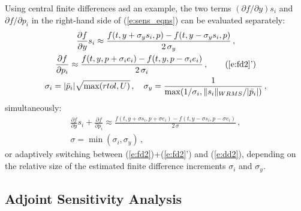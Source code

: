 Using central finite differences asd an example, the two terms 
$({\partial f}/{\partial y}) s_i$ 
and ${\partial f}/{\partial p_i}$ in the right-hand side of (\ref{e:sens_eqns}) 
can be evaluated separately:
\begin{gather}
  \frac{\partial f}{\partial y} s_i \approx \frac{f(t, y+\sigma_y s_i, p)-
    f(t, y-\sigma_y s_i, p)}{2\,\sigma_y} \, , \label{e:fd2} \\
  \frac{\partial f}{\partial p_i} \approx \frac{f(t,y,p + \sigma_i e_i)-
    f(t,y,p - \sigma_i e_i)}{2\,\sigma_i} \, , \tag{\ref{e:fd2}'} \\
  \sigma_i = |{\bar p}_i| \sqrt{\max(rtol, U)} \, , \quad
  \sigma_y = \frac{1}{\max(1/\sigma_i, \|s_i\|_{WRMS}/|{\bar p}_i|)} \, , \nonumber
\end{gather}
simultaneously:
\begin{gather}
  \frac{\partial f}{\partial y} s_i + \frac{\partial f}{\partial p_i} \approx
  \frac{f(t, y+\sigma s_i, p + \sigma e_i) -
    f(t, y-\sigma s_i, p - \sigma e_i)}{2\,\sigma} \, , \label{e:dd2} \\
  \sigma = \min(\sigma_i, \sigma_y) \, , \nonumber
\end{gather}
or adaptively switching between (\ref{e:fd2})+(\ref{e:fd2}') and (\ref{e:dd2}), 
depending on the relative size of the estimated finite difference 
increments $\sigma_i$ and $\sigma_y$.


\subsection{Adjoint Sensitivity Analysis}\label{ss:adj_sensitivity}

